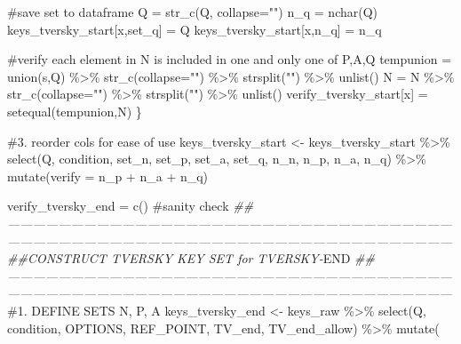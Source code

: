 \documentclass[
  letterpaper,
  DIV=11,
  numbers=noendperiod]{scrreprt}
\newenvironment{Shaded}{\begin{snugshade}}{\end{snugshade}}
\newcommand{\AttributeTok}[1]{\textcolor[rgb]{0.40,0.45,0.13}{#1}}
\newcommand{\CommentTok}[1]{\textcolor[rgb]{0.37,0.37,0.37}{#1}}
\newcommand{\DocumentationTok}[1]{\textcolor[rgb]{0.37,0.37,0.37}{\textit{#1}}}
\newcommand{\FunctionTok}[1]{\textcolor[rgb]{0.28,0.35,0.67}{#1}}
\newcommand{\NormalTok}[1]{\textcolor[rgb]{0.00,0.23,0.31}{#1}}
\newcommand{\OtherTok}[1]{\textcolor[rgb]{0.00,0.23,0.31}{#1}}
\newcommand{\RegionMarkerTok}[1]{\textcolor[rgb]{0.00,0.23,0.31}{#1}}
\newcommand{\SpecialCharTok}[1]{\textcolor[rgb]{0.37,0.37,0.37}{#1}}
\newcommand{\StringTok}[1]{\textcolor[rgb]{0.13,0.47,0.30}{#1}}
\begin{document}
\begin{Shaded}
\begin{Highlighting}[]
  \CommentTok{\#save set to dataframe}
\NormalTok{  Q }\OtherTok{=} \FunctionTok{str\_c}\NormalTok{(Q, }\AttributeTok{collapse=}\StringTok{""}\NormalTok{)}
\NormalTok{  n\_q }\OtherTok{=} \FunctionTok{nchar}\NormalTok{(Q)}
\NormalTok{  keys\_tversky\_start[x,}\StringTok{\textquotesingle{}set\_q\textquotesingle{}}\NormalTok{] }\OtherTok{=}\NormalTok{ Q}
\NormalTok{  keys\_tversky\_start[x,}\StringTok{\textquotesingle{}n\_q\textquotesingle{}}\NormalTok{] }\OtherTok{=}\NormalTok{ n\_q}
  
  \CommentTok{\#verify each element in N is included in one and only one of P,A,Q}
\NormalTok{  tempunion }\OtherTok{=} \FunctionTok{union}\NormalTok{(s,Q) }\SpecialCharTok{\%\textgreater{}\%} \FunctionTok{str\_c}\NormalTok{(}\AttributeTok{collapse=}\StringTok{""}\NormalTok{) }\SpecialCharTok{\%\textgreater{}\%} \FunctionTok{strsplit}\NormalTok{(}\StringTok{""}\NormalTok{) }\SpecialCharTok{\%\textgreater{}\%} \FunctionTok{unlist}\NormalTok{()}
\NormalTok{  N }\OtherTok{=}\NormalTok{ N }\SpecialCharTok{\%\textgreater{}\%} \FunctionTok{str\_c}\NormalTok{(}\AttributeTok{collapse=}\StringTok{""}\NormalTok{) }\SpecialCharTok{\%\textgreater{}\%} \FunctionTok{strsplit}\NormalTok{(}\StringTok{""}\NormalTok{) }\SpecialCharTok{\%\textgreater{}\%} \FunctionTok{unlist}\NormalTok{()}
\NormalTok{  verify\_tversky\_start[x] }\OtherTok{=} \FunctionTok{setequal}\NormalTok{(tempunion,N)}
\NormalTok{\}}

\CommentTok{\#3. reorder cols for ease of use}
\NormalTok{keys\_tversky\_start }\OtherTok{\textless{}{-}}\NormalTok{ keys\_tversky\_start }\SpecialCharTok{\%\textgreater{}\%} \FunctionTok{select}\NormalTok{(Q, condition, set\_n, set\_p, set\_a, set\_q, n\_n, n\_p, n\_a, n\_q) }\SpecialCharTok{\%\textgreater{}\%} \FunctionTok{mutate}\NormalTok{(}\AttributeTok{verify =}\NormalTok{ n\_p }\SpecialCharTok{+}\NormalTok{ n\_a }\SpecialCharTok{+}\NormalTok{ n\_q)}


\NormalTok{verify\_tversky\_end }\OtherTok{=} \FunctionTok{c}\NormalTok{() }\CommentTok{\#sanity check}
\DocumentationTok{\#\#——————————————————————————————————————————————————————————————————————}
\DocumentationTok{\#\#CONSTRUCT TVERSKY KEY SET for TVERSKY{-}}\RegionMarkerTok{END}
\DocumentationTok{\#\#——————————————————————————————————————————————————————————————————————}
\CommentTok{\#1. DEFINE SETS N, P, A}
\NormalTok{keys\_tversky\_end }\OtherTok{\textless{}{-}}\NormalTok{ keys\_raw }\SpecialCharTok{\%\textgreater{}\%} 
  \FunctionTok{select}\NormalTok{(Q, condition, OPTIONS, REF\_POINT, TV\_end, TV\_end\_allow) }\SpecialCharTok{\%\textgreater{}\%} 
  \FunctionTok{mutate}\NormalTok{(}
  

\end{Highlighting}
\end{Shaded}
\end{document}
